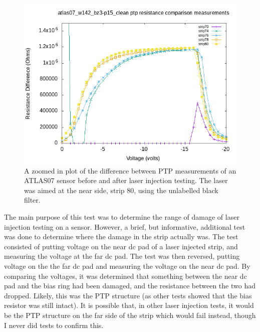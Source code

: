 \documentclass{report}
\begin{document}
            \begin{figure}[h] 
                \includegraphics[height=.4\textheight]{atlas07_w142_bz3-p15_clean_resistance_comparison_plots_zoom}
                \centering
                \caption{ A zoomed in plot of the difference between PTP measurements of an ATLAS07 sensor before and after laser injection testing. The laser was aimed at the near side, strip 80, using the unlabelled black filter. }
                \label{fig:atlas07_w142_bz3-p15_clean_resistance_comparison_plots_zoom}
            \end{figure}
            
            The main purpose of this test was to determine the range of damage of laser injection testing on a sensor. However, a brief, but informative, additional test was done to determine where the damage in the strip actually was. The test consisted of putting voltage on the near dc pad of a laser injected strip, and measuring the voltage at the far dc pad. The test was then reversed, putting voltage on the the far dc pad and measuring the voltage on the near dc pad. By comparing the voltages, it was determined that something between the near dc pad and the bias ring had been damaged, and the resistance between the two had dropped. Likely, this was the PTP structure (as other tests showed that the bias resistor was still intact). It is possible that, in other laser injection tests, it would be the PTP structure on the far side of the strip which would fail instead, though I never did tests to confirm this.
\end{document}

